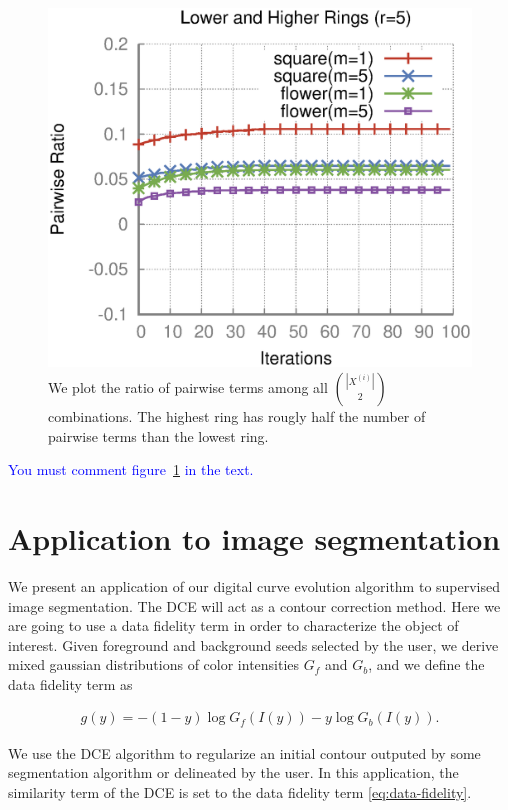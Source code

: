 \documentclass[runningheads]{llncs}
\newcommand{\todo}[1]{{\textcolor{blue}{#1}}}
\begin{document}
\begin{figure}
\center
\includegraphics[scale=0.5]{images/optimization/pairwise-ratio/plot-pairwiseratio-lowerHigher-concavities-probe.eps}
\caption{We plot the ratio of pairwise terms among all $\binom{|X^{(i)}|}{2}$ combinations. The highest ring has rougly half the number of pairwise terms  than the lowest ring.\label{fig:ratio-pairwise-terms}}
\end{figure}

\todo{You must comment figure~\ref{fig:ratio-pairwise-terms} in the text.}

\section{Application to image segmentation}

We present an application of our digital curve evolution algorithm to supervised image segmentation. The DCE will act as a contour correction method. Here we are going to use a data fidelity term in order to characterize the object of interest. Given foreground and background seeds selected by the user, we derive mixed gaussian distributions  of color intensities $G_f$ and $G_b$, and we define the data fidelity term as
	
\begin{align}
  g(y) = -(1-y)\log{G_f(I(y))} - y\log{G_b(I(y))}.
  \label{eq:data-fidelity}
\end{align}	

We use the DCE algorithm to regularize an initial contour outputed by some segmentation algorithm or delineated by the user. In this application, the similarity term of the DCE
is set to the data fidelity term \eqref{eq:data-fidelity}.
	
\end{document}
